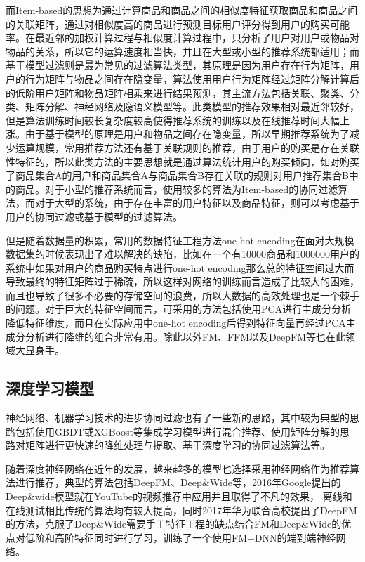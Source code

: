 而Item-based的思想为通过计算商品和商品之间的相似度特征获取商品和商品之间的关联矩阵，通过对相似度高的商品进行预测目标用户评分得到用户的购买可能率。在最近邻的加权计算过程与相似度计算过程中，只分析了用户对用户或物品对物品的关系，所以它的运算速度相当快，并且在大型或小型的推荐系统都适用；而基于模型过滤则是最为常见的过滤算法类型，其原理是因为用户存在行为矩阵，用户的行为矩阵与物品之间存在隐变量，算法使用用户行为矩阵经过矩阵分解计算后的低阶用户矩阵和物品矩阵相乘来进行结果预测，其主流方法包括关联、聚类、分类、矩阵分解、神经网络及隐语义模型等。此类模型的推荐效果相对最近邻较好，但是算法训练时间较长复杂度较高使得推荐系统的训练以及在线推荐时间大幅上涨。由于基于模型的原理是用户和物品之间存在隐变量，所以早期推荐系统为了减少运算规模，常用推荐方法还有基于关联规则的推荐，由于用户的购买是存在关联性特征的，所以此类方法的主要思想就是通过算法统计用户的购买倾向，如对购买了商品集合A的用户和商品集合A与商品集合B存在关联的规则对用户推荐集合B中的商品。对于小型的推荐系统而言，使用较多的算法为Item-based的协同过滤算法，而对于大型的系统，由于存在丰富的用户特征以及商品特征，则可以考虑基于用户的协同过滤或基于模型的过滤算法。

但是随着数据量的积累，常用的数据特征工程方法one-hot encoding在面对大规模数据集的时候表现出了难以解决的缺陷，比如在一个有10000商品和1000000用户的系统中如果对用户的商品购买特点进行one-hot encoding那么总的特征空间过大而导致最终的特征矩阵过于稀疏，所以这样对网络的训练而言造成了比较大的困难，而且也导致了很多不必要的存储空间的浪费，所以大数据的高效处理也是一个棘手的问题。对于巨大的特征空间而言，可采用的方法包括使用PCA进行主成分分析降低特征维度，而且在实际应用中one-hot encoding后得到特征向量再经过PCA主成分分析进行降维的组合非常有用。除此以外FM、FFM以及DeepFM等也在此领域大显身手。

\subsection{深度学习模型}

神经网络、机器学习技术的进步协同过滤也有了一些新的思路，其中较为典型的思路包括使用GBDT或XGBoost等集成学习模型进行混合推荐、使用矩阵分解的思路对矩阵进行更快速的降维处理与提取、基于深度学习的协同过滤算法等。

随着深度神经网络在近年的发展，越来越多的模型也选择采用神经网络作为推荐算法进行推荐，典型的算法包括DeepFM、Deep\&Wide等，2016年Google提出的Deep\&wide模型就在YouTube的视频推荐中应用并且取得了不凡的效果，
离线和在线测试相比传统的算法均有较大提高，同时2017年华为联合高校提出了DeepFM的方法，克服了Deep\&Wide需要手工特征工程的缺点结合FM和Deep\&Wide的优点对低阶和高阶特征同时进行学习，训练了一个使用FM+DNN的端到端神经网络。

